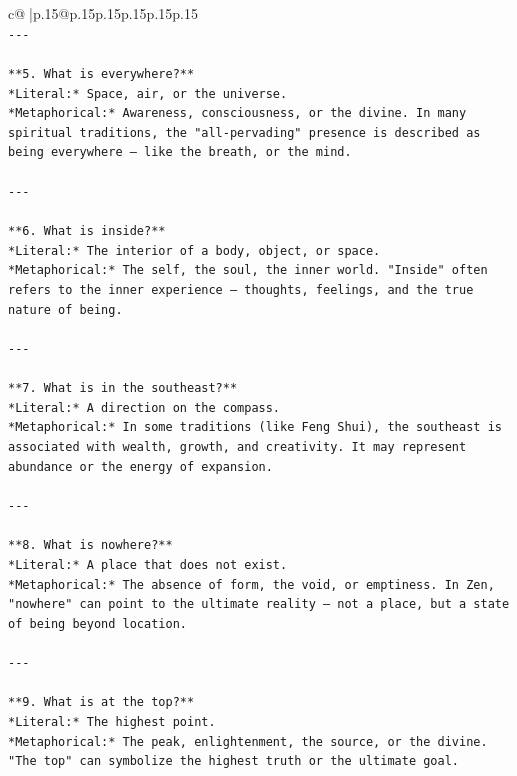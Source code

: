 \documentclass{article}
\begin{document}
{\begin{supertabular}{c@{$\;$}|p{.15\linewidth}@{}p{.15\linewidth}p{.15\linewidth}p{.15\linewidth}p{.15\linewidth}p{.15\linewidth}}
{{{\\ 
\texttt{{-}{-}{-}} \\
\\ 
\texttt{**5. What is everywhere?**  } \\
\texttt{*Literal:* Space, air, or the universe.  } \\
\texttt{*Metaphorical:* Awareness, consciousness, or the divine. In many spiritual traditions, the "all{-}pervading" presence is described as being everywhere — like the breath, or the mind.} \\
\\ 
\texttt{{-}{-}{-}} \\
\\ 
\texttt{**6. What is inside?**  } \\
\texttt{*Literal:* The interior of a body, object, or space.  } \\
\texttt{*Metaphorical:* The self, the soul, the inner world. "Inside" often refers to the inner experience — thoughts, feelings, and the true nature of being.} \\
\\ 
\texttt{{-}{-}{-}} \\
\\ 
\texttt{**7. What is in the southeast?**  } \\
\texttt{*Literal:* A direction on the compass.  } \\
\texttt{*Metaphorical:* In some traditions (like Feng Shui), the southeast is associated with wealth, growth, and creativity. It may represent abundance or the energy of expansion.} \\
\\ 
\texttt{{-}{-}{-}} \\
\\ 
\texttt{**8. What is nowhere?**  } \\
\texttt{*Literal:* A place that does not exist.  } \\
\texttt{*Metaphorical:* The absence of form, the void, or emptiness. In Zen, "nowhere" can point to the ultimate reality — not a place, but a state of being beyond location.} \\
\\ 
\texttt{{-}{-}{-}} \\
\\ 
\texttt{**9. What is at the top?**  } \\
\texttt{*Literal:* The highest point.  } \\
\texttt{*Metaphorical:* The peak, enlightenment, the source, or the divine. "The top" can symbolize the highest truth or the ultimate goal.} \\
}}}
\end{supertabular}}
\end{document}
